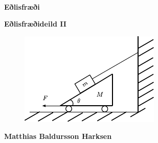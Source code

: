 \pagestyle{empty}

\,

\vspace{5cm}

\begin{center}
    \textbf{\Huge{Eðlisfræði}}
\end{center}

\begin{center}
    \textbf{\Large{Eðlisfræðideild II}}
\end{center}


\begin{figure}[H]
    \centering
    \includegraphics[scale = 2]{figures/forsidumynd.pdf}
\end{figure}

\vspace{7cm}

\begin{center}
    \textbf{\Large{Matthias Baldursson Harksen}}
\end{center}
